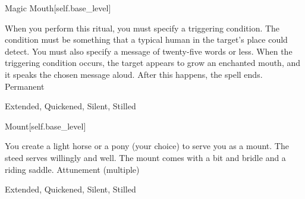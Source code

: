 \begin{spellsection}{Magic Mouth}[self.base_level]
\begin{spellcontent}
\begin{spelltargetinginfo}
\end{spelltargetinginfo}
\begin{spelleffects}
\spellspecial
When you perform this ritual, you must specify a triggering condition.
The condition must be something that a typical human in the target's place could detect.
You must also specify a message of twenty-five words or less.
\spelleffect
When the triggering condition occurs, the target appears to grow an enchanted mouth, and it speaks the chosen message aloud.
After this happens, the spell ends.
\spelldur Permanent
\end{spelleffects}
\end{spellcontent}
\begin{spellfooter}
 Extended, Quickened, Silent, Stilled
\end{spellfooter}
\begin{spellsubcontent}
\end{spellsubcontent}
\end{spellsection}
\begin{spellsection}{Mount}[self.base_level]
\begin{spellcontent}
\begin{spelltargetinginfo}
\spellrng{\rngclose}
\end{spelltargetinginfo}
\begin{spelleffects}
\spelleffect
You create a light horse or a pony (your choice) to serve you as a mount.
The steed serves willingly and well.
The mount comes with a bit and bridle and a riding saddle.
\spelldur Attunement (multiple)
\end{spelleffects}
\end{spellcontent}
\begin{spellfooter}
 Extended, Quickened, Silent, Stilled
\end{spellfooter}
\begin{spellsubcontent}
\end{spellsubcontent}
\end{spellsection}
